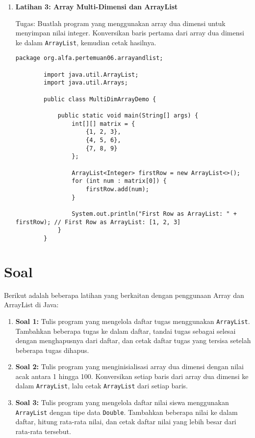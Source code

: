 \begin{enumerate}
	\item \textbf{Latihan 3: Array Multi-Dimensi dan ArrayList}
	
	Tugas: Buatlah program yang menggunakan array dua dimensi untuk menyimpan nilai integer. Konversikan baris pertama dari array dua dimensi ke dalam \texttt{ArrayList}, kemudian cetak hasilnya.
	
	\begin{lstlisting}[style=JavaStyle]
		package org.alfa.pertemuan06.arrayandlist;
		
		import java.util.ArrayList;
		import java.util.Arrays;
		
		public class MultiDimArrayDemo {
			
			public static void main(String[] args) {
				int[][] matrix = {
					{1, 2, 3},
					{4, 5, 6},
					{7, 8, 9}
				};
				
				ArrayList<Integer> firstRow = new ArrayList<>();
				for (int num : matrix[0]) {
					firstRow.add(num);
				}
				
				System.out.println("First Row as ArrayList: " + firstRow); // First Row as ArrayList: [1, 2, 3]
			}
		}
	\end{lstlisting}
\end{enumerate}

\section{Soal}

Berikut adalah beberapa latihan yang berkaitan dengan penggunaan Array dan ArrayList di Java:

\begin{enumerate}
	
	\item \textbf{Soal 1:} Tulis program yang mengelola daftar tugas menggunakan \texttt{ArrayList}. Tambahkan beberapa tugas ke dalam daftar, tandai tugas sebagai selesai dengan menghapusnya dari daftar, dan cetak daftar tugas yang tersisa setelah beberapa tugas dihapus.
	
	\item \textbf{Soal 2:} Tulis program yang menginisialisasi array dua dimensi dengan nilai acak antara 1 hingga 100. Konversikan setiap baris dari array dua dimensi ke dalam \texttt{ArrayList}, lalu cetak \texttt{ArrayList} dari setiap baris.
	
	\item \textbf{Soal 3:} Tulis program yang mengelola daftar nilai siswa menggunakan \texttt{ArrayList} dengan tipe data \texttt{Double}. Tambahkan beberapa nilai ke dalam daftar, hitung rata-rata nilai, dan cetak daftar nilai yang lebih besar dari rata-rata tersebut.
	
\end{enumerate}
